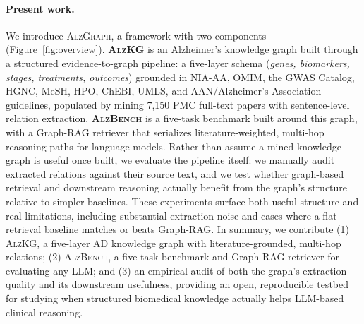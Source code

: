 \documentclass{article}
\begin{document}
\paragraph{Present work.}
We introduce \textsc{AlzGraph}, a framework with two components (Figure~\ref{fig:overview}). \textbf{\textsc{AlzKG}} is an Alzheimer's knowledge graph built through a structured evidence-to-graph pipeline: a five-layer schema (\emph{genes, biomarkers, stages, treatments, outcomes}) grounded in NIA-AA, OMIM, the GWAS Catalog, HGNC, MeSH, HPO, ChEBI, UMLS, and AAN/Alzheimer's Association guidelines, populated by mining 7{,}150 PMC full-text papers with sentence-level relation extraction. \textbf{\textsc{AlzBench}} is a five-task benchmark built around this graph, with a Graph-RAG retriever that serializes literature-weighted, multi-hop reasoning paths for language models. Rather than assume a mined knowledge graph is useful once built, we evaluate the pipeline itself: we manually audit extracted relations against their source text, and we test whether graph-based retrieval and downstream reasoning actually benefit from the graph's structure relative to simpler baselines. These experiments surface both useful structure and real limitations, including substantial extraction noise and cases where a flat retrieval baseline matches or beats Graph-RAG. In summary, we contribute (1) \textsc{AlzKG}, a five-layer AD knowledge graph with literature-grounded, multi-hop relations; (2) \textsc{AlzBench}, a five-task benchmark and Graph-RAG retriever for evaluating any LLM; and (3) an empirical audit of both the graph's extraction quality and its downstream usefulness, providing an open, reproducible testbed for studying when structured biomedical knowledge actually helps LLM-based clinical reasoning.
\end{document}
